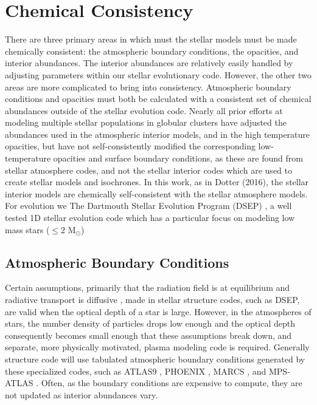 \section{Chemical Consistency}\label{sec:const}
There are three primary areas in which must the stellar models must be made
chemically consistent: the atmospheric boundary conditions, the opacities, and
interior abundances. The interior abundances are relatively easily handled by
adjusting parameters within our stellar evolutionary code. However, the other
two areas are more complicated to bring into consistency. Atmospheric boundary
conditions and opacities must both be calculated with a consistent set of
chemical abundances outside of the stellar evolution code.
Nearly all prior efforts at modeling multiple stellar populations in
globular clusters have adjusted the abundances used in the atmospheric interior
models, and in the high temperature opacities, but have not self-consistently
modified the corresponding low-temperature opacities and surface boundary
conditions, as these are found from stellar atmosphere codes, and not the
stellar interior codes which are used to create stellar models and isochrones.
In this work, as in Dotter (2016), the stellar interior models are chemically
self-consistent with the stellar atmosphere models. For evolution we The Dartmouth Stellar
Evolution Program (DSEP) \citep{Dotter2008}, a well tested 1D stellar evolution
code which has a particular focus on modeling low mass stars ($\le 2$
M$_{\odot}$)

\subsection{Atmospheric Boundary Conditions}\label{sec:atm}
Certain assumptions, primarily that the radiation field is at equilibrium and
radiative transport is diffusive \citep{Salaris2005}, made in stellar structure
codes, such as DSEP, are valid when the optical depth of a star is large.
However, in the atmospheres of stars, the number density of particles drops low
enough and the optical depth consequently becomes small enough that these
assumptions break down, and separate, more physically motivated, plasma
modeling code is required. Generally structure code will use tabulated
atmospheric boundary conditions generated by these specialized codes, such as ATLAS9
\citep{Kurucz1993}, PHOENIX \citep{Husser2013}, MARCS \citep{Gustafsson2008},
and MPS-ATLAS \citep{Kostogryz2023}. Often, as the boundary conditions are
expensive to compute, they are not updated as interior abundances vary. 


